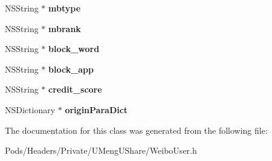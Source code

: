 \begin{DoxyCompactItemize}
\item 
\mbox{\label{interface_weibo_user_abffb51b3459cc543bfe7dc0a14e401ef}} 
N\+S\+String $\ast$ {\bfseries mbtype}
\item 
\mbox{\label{interface_weibo_user_a62f967a77fec58aaf0bc8aba82cd3b1e}} 
N\+S\+String $\ast$ {\bfseries mbrank}
\item 
\mbox{\label{interface_weibo_user_a77066c978ff5d83efe02abd6f78f85f0}} 
N\+S\+String $\ast$ {\bfseries block\+\_\+word}
\item 
\mbox{\label{interface_weibo_user_acac6d13c68bd88d9f51b038f4ba81c34}} 
N\+S\+String $\ast$ {\bfseries block\+\_\+app}
\item 
\mbox{\label{interface_weibo_user_a85125aaa2e1ce47afe4f96b9ff8e8a94}} 
N\+S\+String $\ast$ {\bfseries credit\+\_\+score}
\item 
\mbox{\label{interface_weibo_user_ae1c1555644e9a29f384e5e1ba8fa58cc}} 
N\+S\+Dictionary $\ast$ {\bfseries origin\+Para\+Dict}
\end{DoxyCompactItemize}


The documentation for this class was generated from the following file\+:\begin{DoxyCompactItemize}
\item 
Pods/\+Headers/\+Private/\+U\+Meng\+U\+Share/Weibo\+User.\+h\end{DoxyCompactItemize}
